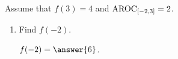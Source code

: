 \documentclass{ximera}
\author{Elizabeth Miller}
\begin{document}
\begin{exercise}

Assume that $f(3)=4$ and $\mathrm{AROC}_{[-2,3]}=2$.

\begin{enumerate}
\item Find $f(-2)$.

$f(-2) = \answer{6}$.  
	
\end{enumerate}

\end{exercise}
\end{document}
